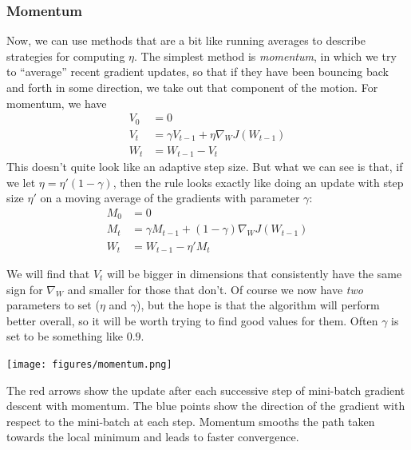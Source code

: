 \subsubsection{Momentum} 
Now, we can use methods that are a bit like running averages to
describe strategies for computing $\eta$.
The simplest method is {\em momentum}, in  which we try to ``average'' recent
gradient updates,  so that if they have been bouncing back and forth
in some direction, we take out that component of the motion.  For
momentum, we have
\begin{align*}
V_0 & = 0 \\
V_t & = \gamma V_{t-1} + \eta \nabla_W J(W_{t-1}) \\
W_t & = W_{t-1} - V_t
\end{align*}
This doesn't quite look like an adaptive step size.  But what we can
see is that, if we let $\eta = \eta'(1 - \gamma)$, then the rule looks exactly like doing an update with
step size $\eta'$ on a moving average of the gradients with parameter
$\gamma$:
\begin{align*}
M_0 & = 0 \\
M_t & = \gamma M_{t-1} + (1 - \gamma) \nabla_W J(W_{t-1}) \\
W_t & = W_{t-1} - \eta' M_t
\end{align*}


We will find that $V_t$ will be bigger in dimensions that consistently
have the same sign for $\nabla_{W}$ and smaller for those that
don't.   Of course we now have {\em two}  parameters  to set ($\eta$
and $\gamma$), but the
hope is  that the algorithm will perform better overall, so it will be
worth trying to find good values for them.  Often $\gamma$ is  set to
be something like $0.9$.  
\begin{examplebox}
\begin{center}
\texttt{[image: figures/momentum.png]}
\end{center}
The red arrows show the update after each successive step of
mini-batch gradient descent with momentum.  The blue points show the
direction of the gradient with respect to the mini-batch at each step.
Momentum smooths the path taken towards the local minimum and leads to
faster convergence.
\end{examplebox}

